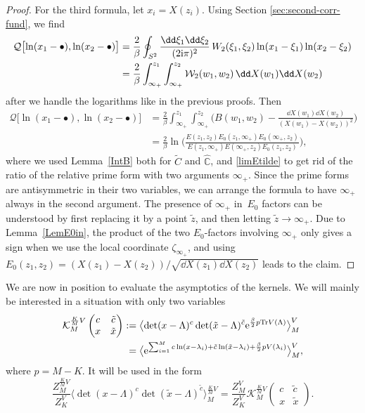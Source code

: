 \documentclass[10pt,a4paper]{amsart}
\numberwithin{equation}{section}
\begin{document}
\begin{proof}
For the third formula, let $x_i = X(z_i)$. Using Section \ref{sec:second-corr-fund}, we find
\begin{align*}
 \mathcal{Q}\bigl[\ln(x_1 - \bullet), \ln(x_2 - \bullet)\bigr] &{} = \frac{2}{\beta} \oint_{S^2} \frac{\dd \xi_1\dd \xi_2}{(2{\rm i}\pi)^2}\,W_2(\xi_1,\xi_2) \ln(x_1 - \xi_1)\ln(x_2 - \xi_2) \\
 &{} = \frac{2}{\beta} \int_{\infty_+}^{z_1} \int_{\infty_+}^{z_2} \mathcal{W}_2(w_1,w_2)\,\dd X(w_1) \dd X(w_2)
\end{align*}
after we handle the logarithms like in the previous proofs. Then
\begin{align*}
 \mathcal{Q}\bigl[\ln(x_1 - \bullet), \ln(x_2 - \bullet)\bigr] &{} = \frac{2}{\beta} \int_{\infty_+}^{z_1} \int_{\infty_+}^{z_2} \biggl(B(w_1,w_2) - \frac{\dd X(w_1)\dd X(w_2)}{(X(w_1) - X(w_2))^2}\biggr) \\
 &{} = \frac{2}{\beta} \ln\biggl(\frac{E(z_1,z_2)E_0(z_1,\infty_+)E_0(\infty_+,z_2)}{E(z_1,\infty_+)E(\infty_+,z_2)E_0(z_1,z_2)}\biggr),
\end{align*}
where we used Lemma~\ref{IntB} both for $\widetilde{C}$ and $\widehat{\mathbb{C}}$, and \eqref{limEtilde} to get rid of the ratio of the relative prime form with two arguments $\infty_+$. Since the prime forms are antisymmetric in their two variables, we can arrange the formula to have $\infty_+$ always in the second argument. The presence of $\infty_+$ in~$E_0$ factors can be understood by first replacing it by a point $\tilde{z}$, and then letting $\tilde{z} \rightarrow \infty_+$. Due to Lemma~\ref{LemE0in}, the product of the two $E_0$-factors involving $\infty_+$ only gives a sign when we use the local coordinate $\zeta_{\infty_+}$, and using $E_0(z_1,z_2) = (X(z_1) - X(z_2))/\sqrt{\dd X(z_1)\dd X(z_2)}$ leads to the claim.
\end{proof}


We are now in position to evaluate the asymptotics of the kernels. We will mainly be interested in a situation with only two variables
\begin{align}
\nonumber
 \mathcal{K}_{M}^{\frac{K}{M}V}\left(\begin{matrix} c & \tilde{c} \\ x & \tilde{x} \end{matrix}\right) :={}& \bigl\langle \det(x - \Lambda)^c \det(\tilde{x} - \Lambda)^{\tilde{c}}{\rm e}^{\frac{\beta}{2}p{\rm Tr} V(\Lambda)}\bigr\rangle_M^V \\
={} & \bigl\langle{\rm e}^{\sum_{i = 1}^M c\ln(x - \lambda_i) + \tilde{c}\ln(\tilde{x} - \lambda_i) + \frac{\beta}{2}pV(\lambda_i)}\bigr\rangle_M^V,\label{Kmcc}
\end{align}
where $p = M - K$. It will be used in the form
\begin{equation}
\label{Krat}
\frac{Z_M^{\frac{K}{M}V}}{Z_K^V} \bigl\langle\det(x - \Lambda)^c\det(\tilde{x} - \Lambda)^{\tilde{c}}\bigr\rangle_M^{\frac{K}{M}V} = \frac{Z_M^V}{Z_K^V} \mathcal{K}_{M}^{\frac{K}{M}V}\left(\begin{matrix} c & \tilde{c} \\ x & \tilde{x}\end{matrix}\right).
\end{equation}
\end{document}
